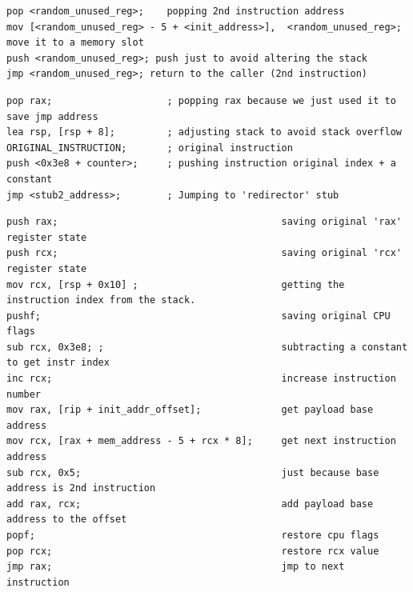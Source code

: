 \documentclass[runningheads]{llncs}
\begin{document}
\begin{lstlisting}[label={lst:stub1},language={[x86masm]Assembler}, basicstyle=\scriptsize\ttfamily, caption={Base-address component. Reproduced from Listing~1 of~\cite{zone_secrypt_2026}.}]
pop <random_unused_reg>;    popping 2nd instruction address
mov [<random_unused_reg> - 5 + <init_address>],  <random_unused_reg>; move it to a memory slot
push <random_unused_reg>; push just to avoid altering the stack
jmp <random_unused_reg>; return to the caller (2nd instruction)
\end{lstlisting}

\begin{lstlisting}[label={lst:instrWrap}, language={[x86masm]Assembler}, basicstyle=\scriptsize\ttfamily, caption={Instruction wrapper. Reproduced from Listing~2 of~\cite{zone_secrypt_2026}.}]
pop rax;                    ; popping rax because we just used it to save jmp address
lea rsp, [rsp + 8];         ; adjusting stack to avoid stack overflow
ORIGINAL_INSTRUCTION;       ; original instruction
push <0x3e8 + counter>;     ; pushing instruction original index + a constant
jmp <stub2_address>;        ; Jumping to 'redirector' stub 
\end{lstlisting}

\begin{lstlisting}[label={lst:stub2red},language={[x86masm]Assembler}, basicstyle=\scriptsize\ttfamily, caption={x64 redirector. Reproduced from Listing~3 of~\cite{zone_secrypt_2026}.}]
push rax;                                       saving original 'rax' register state
push rcx;                                       saving original 'rcx' register state
mov rcx, [rsp + 0x10] ;                         getting the instruction index from the stack.
pushf;                                          saving original CPU flags
sub rcx, 0x3e8; ;                               subtracting a constant to get instr index
inc rcx;                                        increase instruction number
mov rax, [rip + init_addr_offset];              get payload base address
mov rcx, [rax + mem_address - 5 + rcx * 8];     get next instruction address
sub rcx, 0x5;                                   just because base address is 2nd instruction
add rax, rcx;                                   add payload base address to the offset
popf;                                           restore cpu flags
pop rcx;                                        restore rcx value
jmp rax;                                        jmp to next instruction
\end{lstlisting}
\end{document}

